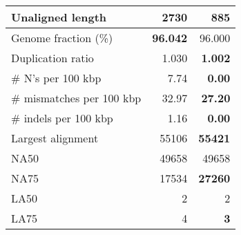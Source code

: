 \documentclass[12pt,a4paper]{article}
\begin{document}
\begin{table}[ht]
\begin{center}
\begin{tabular}{|l*{2}{|r}|}
Unaligned length & 2730 & {\bf 885} \\ \hline
Genome fraction (\%) & {\bf 96.042} & 96.000 \\ \hline
Duplication ratio & 1.030 & {\bf 1.002} \\ \hline
\# N's per 100 kbp & 7.74 & {\bf 0.00} \\ \hline
\# mismatches per 100 kbp & 32.97 & {\bf 27.20} \\ \hline
\# indels per 100 kbp & 1.16 & {\bf 0.00} \\ \hline
Largest alignment & 55106 & {\bf 55421} \\ \hline
NA50 & 49658 & 49658 \\ \hline
NA75 & 17534 & {\bf 27260} \\ \hline
LA50 & 2 & 2 \\ \hline
LA75 & 4 & {\bf 3} \\ \hline
\end{tabular}
\end{center}
\end{table}
\end{document}
